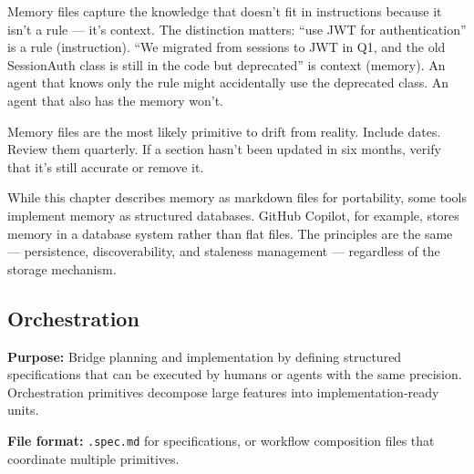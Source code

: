 \documentclass[
  a4paper,
  DIV=11,
  numbers=noendperiod]{scrreprt}
\begin{document}
Memory files capture the knowledge that doesn't fit in instructions
because it isn't a rule --- it's context. The distinction matters: ``use
JWT for authentication'' is a rule (instruction). ``We migrated from
sessions to JWT in Q1, and the old SessionAuth class is still in the
code but deprecated'' is context (memory). An agent that knows only the
rule might accidentally use the deprecated class. An agent that also has
the memory won't.

Memory files are the most likely primitive to drift from reality.
Include dates. Review them quarterly. If a section hasn't been updated
in six months, verify that it's still accurate or remove it.

\begin{tcolorbox}[enhanced jigsaw, arc=.35mm, bottomrule=.15mm, bottomtitle=1mm, breakable, colback=white, colbacktitle=quarto-callout-note-color!10!white, colframe=quarto-callout-note-color-frame, coltitle=black, left=2mm, leftrule=.75mm, opacityback=0, opacitybacktitle=0.6, rightrule=.15mm, title=\textcolor{quarto-callout-note-color}{\faInfo}\hspace{0.5em}{Memory Storage Varies by Tool}, titlerule=0mm, toprule=.15mm, toptitle=1mm]

While this chapter describes memory as markdown files for portability,
some tools implement memory as structured databases. GitHub Copilot, for
example, stores memory in a database system rather than flat files. The
principles are the same --- persistence, discoverability, and staleness
management --- regardless of the storage mechanism.

\end{tcolorbox}

\subsection{Orchestration}\label{orchestration}

\textbf{Purpose:} Bridge planning and implementation by defining
structured specifications that can be executed by humans or agents with
the same precision. Orchestration primitives decompose large features
into implementation-ready units.

\textbf{File format:} \texttt{.spec.md} for specifications, or workflow
composition files that coordinate multiple primitives.
\end{document}
